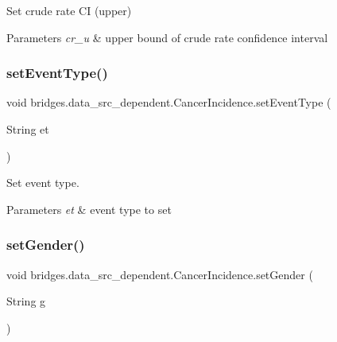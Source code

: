 Set crude rate CI (upper) 


\begin{DoxyParams}{Parameters}
{\em cr\+\_\+u} & upper bound of crude rate confidence interval \\
\hline
\end{DoxyParams}
\mbox{\label{classbridges_1_1data__src__dependent_1_1_cancer_incidence_a39338b20223e60b79fa38b3034ca46b7}} 
\subsubsection{\texorpdfstring{setEventType()}{setEventType()}}
{\footnotesize\ttfamily void bridges.\+data\+\_\+src\+\_\+dependent.\+Cancer\+Incidence.\+set\+Event\+Type (\begin{DoxyParamCaption}\item[{String}]{et }\end{DoxyParamCaption})}



Set event type. 


\begin{DoxyParams}{Parameters}
{\em et} & event type to set \\
\hline
\end{DoxyParams}
\mbox{\label{classbridges_1_1data__src__dependent_1_1_cancer_incidence_a217681578e13197e1d177932c73ea80f}} 
\subsubsection{\texorpdfstring{setGender()}{setGender()}}
{\footnotesize\ttfamily void bridges.\+data\+\_\+src\+\_\+dependent.\+Cancer\+Incidence.\+set\+Gender (\begin{DoxyParamCaption}\item[{String}]{g }\end{DoxyParamCaption})}



